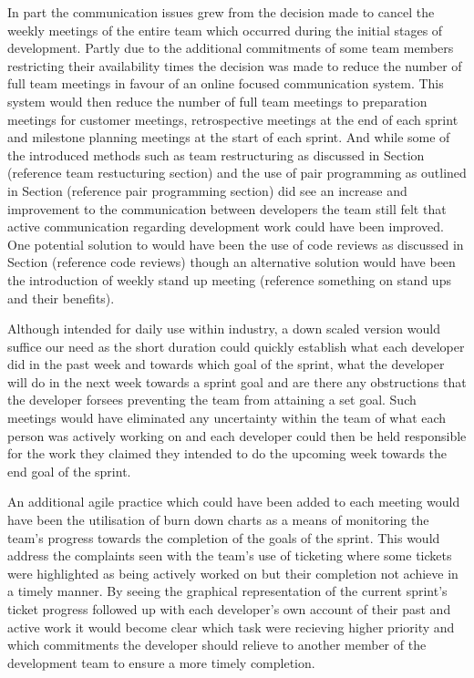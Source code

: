 \documentclass{l3proj}
\begin{document}
In part the communication issues grew from the decision made to cancel the weekly meetings of the entire team which occurred during the initial stages of development. Partly due to the additional commitments of some team members restricting their availability times the decision was made to reduce the number of full team meetings in favour of an online focused communication system. This system would then reduce the number of full team meetings to preparation meetings for customer meetings, retrospective meetings at the end of each sprint and milestone planning meetings at the start of each sprint. And while some of the introduced methods such as team restructuring as discussed in Section (reference team restucturing section) and the use of pair programming as outlined in Section (reference pair programming section) did see an increase and improvement to the communication between developers the team still felt that active communication regarding development work could have been improved. One potential solution to would have been the use of code reviews as discussed in Section (reference code reviews) though an alternative solution would have been the introduction of weekly stand up meeting (reference something on stand ups and their benefits).

Although intended for daily use within industry, a down scaled version would suffice our need as the short duration could quickly establish what each developer did in the past week and towards which goal of the sprint, what the developer will do in the next week towards a sprint goal and are there any obstructions that the developer forsees preventing the team from attaining a set goal. Such meetings would have eliminated any uncertainty within the team of what each person was actively working on and each developer could then be held responsible for the work they claimed they intended to do the upcoming week towards the end goal of the sprint. 

An additional agile practice which could have been added to each meeting would have been the utilisation of burn down charts as a means of monitoring the team's progress towards the completion of the goals of the sprint. This would address the complaints seen with the team's use of ticketing where some tickets were highlighted as being actively worked on but their completion not achieve in a timely manner. By seeing the graphical representation of the current sprint's ticket progress followed up with each developer's own account of their past and active work it would become clear which task were recieving higher priority and which commitments the developer should relieve to another member of the development team to ensure a more timely completion.
\end{document}
